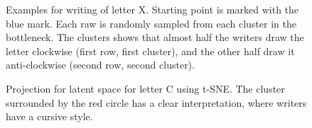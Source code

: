 \begin{figure}[!htbp]
      \caption{Examples for writing of letter X. Starting point is marked with the blue mark. Each raw is randomly sampled from each cluster in the bottleneck. The clusters shows that almost half the writers draw the letter clockwise (first row, first cluster), and the other half draw it anti-clockwise (second row, second cluster).}
      \label{fig:examples_x}
  \end{figure}

  \begin{figure}[htbp!]
      \centering
      \caption{Projection for latent space for letter C using t-SNE. The cluster surrounded by the red circle has a clear interpretation, where writers have a cursive style.}
      \label{fig:c_letter}
  \end{figure}


